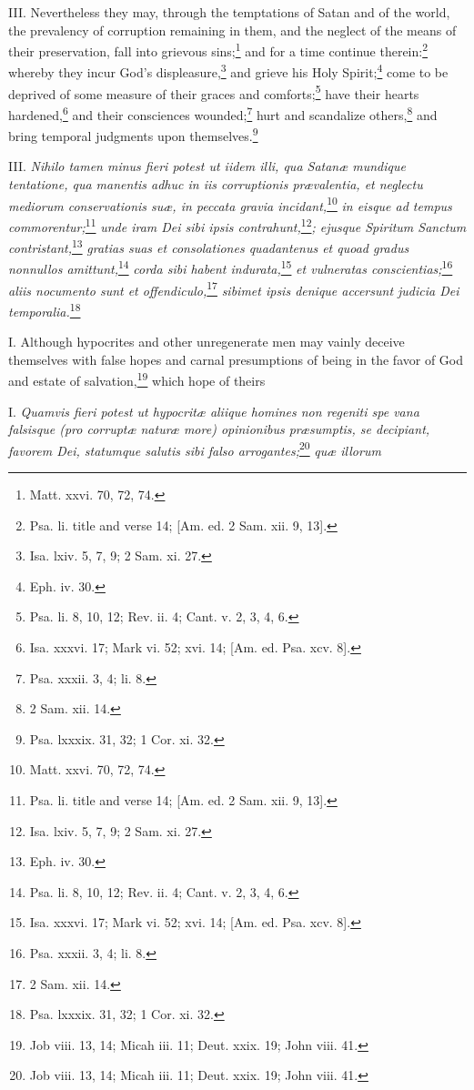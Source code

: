 III. Nevertheless they may, through the temptations of Satan and of the world, the prevalency of corruption remaining in them, and the neglect of the means of their preservation, fall into grievous sins;\footnote{Matt. xxvi. 70, 72, 74.} and for a time continue therein:\footnote{Psa. li. title and verse 14; [Am. ed. 2 Sam. xii. 9, 13].} whereby they incur God's displeasure,\footnote{Isa. lxiv. 5, 7, 9; 2 Sam. xi. 27.} and grieve his Holy Spirit;\footnote{Eph. iv. 30.} come to be deprived of some measure of their graces and comforts;\footnote{Psa. li. 8, 10, 12; Rev. ii. 4; Cant. v. 2, 3, 4, 6.} have their hearts hardened,\footnote{Isa. xxxvi. 17; Mark vi. 52; xvi. 14; [Am. ed. Psa. xcv. 8].} and their consciences wounded;\footnote{Psa. xxxii. 3, 4; li. 8.} hurt and scandalize others,\footnote{2 Sam. xii. 14.} and bring temporal judgments upon themselves.\footnote{Psa. lxxxix. 31, 32; 1 Cor. xi. 32.}

III. \emph{Nihilo tamen minus fieri potest ut iidem illi, qua Satanæ mundique tentatione, qua manentis adhuc in iis corruptionis prævalentia, et neglectu mediorum conservationis suæ, in peccata gravia incidant,}\footnote{Matt. xxvi. 70, 72, 74.}\emph{ in eisque ad tempus commorentur;}\footnote{Psa. li. title and verse 14; [Am. ed. 2 Sam. xii. 9, 13].}\emph{ unde iram Dei sibi ipsis contrahunt,}\footnote{Isa. lxiv. 5, 7, 9; 2 Sam. xi. 27.}\emph{; ejusque Spiritum Sanctum contristant,}\footnote{Eph. iv. 30.}\emph{ gratias suas et consolationes quadantenus et quoad gradus nonnullos amittunt,}\footnote{Psa. li. 8, 10, 12; Rev. ii. 4; Cant. v. 2, 3, 4, 6.}\emph{ corda sibi habent indurata,}\footnote{Isa. xxxvi. 17; Mark vi. 52; xvi. 14; [Am. ed. Psa. xcv. 8].}\emph{ et vulneratas conscientias;}\footnote{Psa. xxxii. 3, 4; li. 8.}\emph{ aliis nocumento sunt et offendiculo,}\footnote{2 Sam. xii. 14.}\emph{ sibimet ipsis denique accersunt judicia Dei temporalia.}\footnote{Psa. lxxxix. 31, 32; 1 Cor. xi. 32.}


I. Although hypocrites and other unregenerate men may vainly deceive themselves with false hopes and carnal presumptions of being in the favor of God and estate of salvation,\footnote{Job viii. 13, 14; Micah iii. 11; Deut. xxix. 19; John viii. 41.} which hope of theirs

I. \emph{Quamvis fieri potest ut hypocritæ aliique homines non regeniti spe vana falsisque (pro corruptæ naturæ more) opinionibus præsumptis, se decipiant, favorem Dei, statumque salutis sibi falso arrogantes;}\footnote{Job viii. 13, 14; Micah iii. 11; Deut. xxix. 19; John viii. 41.}\emph{ quæ illorum }

